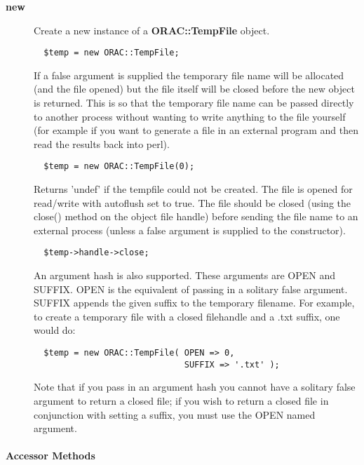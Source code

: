 \begin{description}

\item[{\textbf{new}}] \mbox{}

Create a new instance of a \textbf{ORAC::TempFile} object.

\begin{verbatim}
  $temp = new ORAC::TempFile;
\end{verbatim}


If a false argument is supplied the temporary file
name will be allocated (and the file opened) but the
file itself will be closed before the new object is returned.
This is so that the temporary file name can be passed directly
to another process without wanting to write anything to the
file yourself (for example if you want to generate a file
in an external program and then read the results back into
perl).

\begin{verbatim}
  $temp = new ORAC::TempFile(0);
\end{verbatim}


Returns 'undef' if the tempfile could not be created.
The file is opened for read/write with autoflush set to true.
The file should be closed (using the close() method on the
object file handle) before sending the file name to an external
process (unless a false argument is supplied to the constructor).

\begin{verbatim}
  $temp->handle->close;
\end{verbatim}


An argument hash is also supported. These arguments are OPEN and
SUFFIX. OPEN is the equivalent of passing in a solitary false
argument. SUFFIX appends the given suffix to the temporary
filename. For example, to create a temporary file with a closed
filehandle and a .txt suffix, one would do:

\begin{verbatim}
  $temp = new ORAC::TempFile( OPEN => 0,
                              SUFFIX => '.txt' );
\end{verbatim}


Note that if you pass in an argument hash you cannot have a solitary
false argument to return a closed file; if you wish to return a closed
file in conjunction with setting a suffix, you must use the OPEN named
argument.

\end{description}
\paragraph*{Accessor Methods\label{ORAC::TempFile_Accessor_Methods}}


